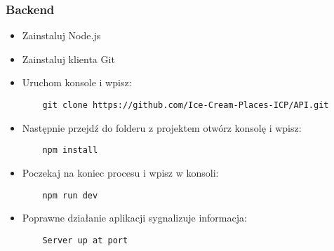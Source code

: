\documentclass{article}
\begin{document}
            \subsubsection{Backend}
            \begin{itemize}
                \item Zainstaluj Node.js
                \item Zainstaluj klienta Git
                \item Uruchom konsole i wpisz:
                \begin{lstlisting}
    git clone https://github.com/Ice-Cream-Places-ICP/API.git
                \end{lstlisting}
                \item Następnie przejdź do folderu z projektem otwórz konsolę i wpisz:
                \begin{lstlisting}
    npm install
                \end{lstlisting}
                \item Poczekaj na koniec procesu i wpisz w konsoli:
                \begin{lstlisting}
    npm run dev
                \end{lstlisting}
                \item Poprawne działanie aplikacji sygnalizuje informacja: 
                \begin{lstlisting}
    Server up at port
                \end{lstlisting}
                \end{itemize}
\end{document}
